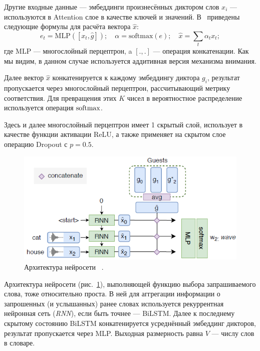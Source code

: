 Другие входные данные --- эмбеддинги произнесённых диктором слов $x_i$ ---
используются в Attention слое в качестве ключей и значений. В~\citeisr{}
приведены следующие формулы для расчёта вектора $\hat{x}$:
\begin{equation*}
    e_t = \text{MLP}([x_t, \hat{g}]); \quad \alpha = \text{softmax}(e); \quad
    \hat{x} = \sum_t{\alpha_t x_t};
\end{equation*}
где $\text{MLP}$ --- многослойный перцептрон, a $[.,.]$ --- операция
конкатенации. Как мы видим, в данном случае используется аддитивная версия
механизма внимания.

Далее вектор $\hat{x}$ конкатенируется к каждому эмбеддингу диктора $g_i$,
результат пропускается через многослойный перцептрон, рассчитывающий метрику
соответствия. Для превращения этих $K$ чисел в вероятностное распределение
используется операция $\operatorname{\text{softmax}}$.

Здесь и далее многослойный перцептрон имеет 1 скрытый слой, использует в
качестве функции активации ReLU, а также применяет на скрытом слое операцию
Dropout с $p=0.5$.

\begin{figure}[hbt]
    \centering
    \includegraphics[scale=1.0]{figures/enquirer.png}
    \caption{Архитектура нейросети \enquirer{}~\citeisr.}
    \label{fig:enquirer}
\end{figure}

Архитектура нейросети \enquirer{} (рис.~\ref{fig:enquirer}), выполняющей
функцию выбора запрашиваемого слова, тоже относительно проста. В ней для
аггрегации информации о запрошенных (и услышанных) ранее словах используется
рекуррентная нейронная сеть (\textit{RNN}), если быть точнее --- BiLSTM\@.
Далее к последнему скрытому состоянию BiLSTM конкатенируется усреднённый
эмбеддинг дикторов, результат пропускается через MLP. Выходная размерность
равна $V$ --- числу слов в словаре.

